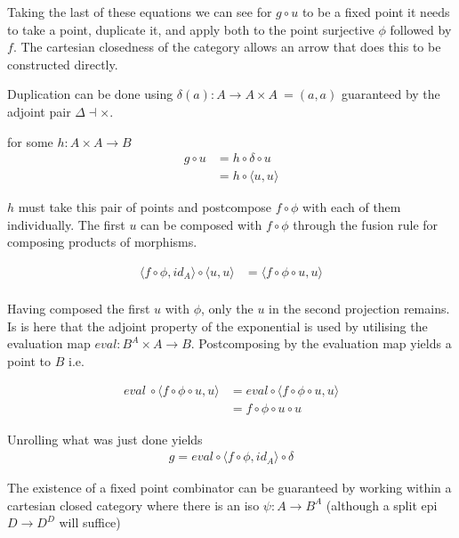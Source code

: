 \documentclass[a4paper,10pt]{article}
\begin{document}
Taking the last of these equations we can see for $g \circ u$ to be a fixed point it needs to take a point,
duplicate it, and apply both to the point surjective $\phi$ followed by
$f$. The cartesian
closedness of the category allows an arrow that does this to be constructed
directly.

Duplication can be done using $\delta(a): A \rightarrow A \times A \ = (a, a)$
guaranteed by the adjoint pair $\Delta  \dashv \times$.

for some $h: A \times A \rightarrow B$
\begin{align*}
    g \circ u &= h \circ \delta \circ u \\
    &= h \circ \langle u, u \rangle
\end{align*}

$h$ must take this pair of points and postcompose $f \circ \phi$ with each of them
individually. The first $u$ can be composed with $ f \circ \phi $ through the fusion rule
for composing products of morphisms.

\begin{align*}
    \langle f \circ \phi, id_A \rangle \circ \langle u, u \rangle &=
    \langle f \circ \phi \circ u, u \rangle \\
\end{align*}

Having composed the first $u$ with $\phi$, only the $u$ in the second projection
remains. Is is here that the adjoint property of the exponential is used by
utilising the evaluation map $eval: B^{A} \times A \rightarrow B$. Postcomposing
by the evaluation map yields a point to $B$ i.e.

\begin{align*}
    eval \ \circ \langle f \circ \phi \circ u, u \rangle
    &= eval \circ \langle f \circ \phi \circ u, u \rangle \\
    &= f \circ \phi \circ u \circ u
\end{align*}



Unrolling what was just done yields
\begin{align*}
    g = eval \circ \langle f \circ \phi, id_A \rangle \circ \delta
\end{align*}

The existence of a fixed point combinator can be guaranteed by working within a
cartesian closed category where there is an iso $\psi: A \rightarrow B^A$
(although a split epi $D \rightarrow D^D$ will suffice)  
\end{document}
